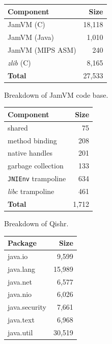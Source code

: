 \documentclass[a4paper,12pt,twoside,openright]{report}
\newcommand{\tool}[1]{\emph{#1}}
\newcommand{\lib}[1]{\tool{lib#1}}
\begin{document}
\begin{table}[t]
	\centering
	\begin{subfigure}{0.45\textwidth}
		\centering
		\footnotesize
		\begin{tabular}{|l|r|}
		\hline
		\bf Component		& \bf Size		\\
		\hline
		JamVM (C)		& 18,118		\\
		JamVM (Java)		& 1,010		\\
		JamVM (MIPS ASM)	& 240		\\
		\emph{zlib} (C)		& 8,165		\\
		\hline
		\bf Total		& 27,533	\\
		\hline
		\end{tabular}
		\caption{Breakdown of JamVM code base.}
		\label{table:JamTCB}
	\end{subfigure}
	\begin{subfigure}{0.45\textwidth}
		\centering
		\footnotesize
		\begin{tabular}{|l|r|}
		\hline
		\bf Component			& \bf Size		\\
		\hline
		shared			& 75			\\
		method binding	& 208 		\\
		native handles	& 201		\\
		garbage collection	& 133		\\				
		\texttt{JNIEnv} trampoline	& 634		\\
		\lib{c} trampoline	& 461		\\
		\hline
		\bf Total		& 1,712	\\
		\hline
		\end{tabular}
		\caption{Breakdown of Qishr.}
		\label{table:QishrTCB}
	\end{subfigure}
	\begin{subfigure}{0.45\textwidth}
		\centering
		\footnotesize
		\begin{tabular}{|l|r|}
		\hline
		\bf Package	& \bf Size		\\
		\hline
		java.io		& 9,599		\\ %
		java.lang		& 15,989		\\ %
		java.net		& 6,577		\\ %
		java.nio		& 6,026		\\ %
		java.security	& 7,661		\\ %
		java.text		& 6,968		\\ %
		java.util		& 30,519		\\ %

\end{tabular}
\end{subfigure}
\end{table}
\end{document}
